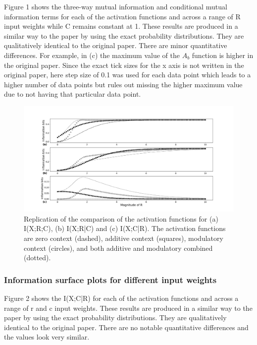 Figure 1 shows the three-way mutual information and conditional mutual information terms for each of the activation functions and across a range of R input weights while C remains constant at 1. These results are produced in a similar way to the paper by using the exact probability distributions. They are qualitatively identical to the original paper. There are minor quantitative differences. For example, in (c) the maximum value of the $A_b$ function is higher in the original paper. Since the exact tick sizes for the x axis is not written in the original paper, here step size of 0.1 was used for each data point which leads to a higher number of data points but rules out missing the higher maximum value due to not having that particular data point. 

\begin{figure}[H]
    \includegraphics[width=\textwidth]{figure_1.png}
      \caption{Replication of the comparison of the activation functions for (a) I(X;R;C), (b) I(X;R|C) and (c) I(X;C|R). The activation functions are zero context (dashed), additive context (squares), modulatory context (circles), and both additive and modulatory combined (dotted).}
\end{figure}

\subsubsection{Information surface plots for different input weights}

Figure 2 shows the I(X;C|R) for each of the activation functions and across a range of r and c input weights. These results are produced in a similar way to the paper by using the exact probability distributions. They are qualitatively identical to the original paper. There are no notable quantitative differences and the values look very similar. 


